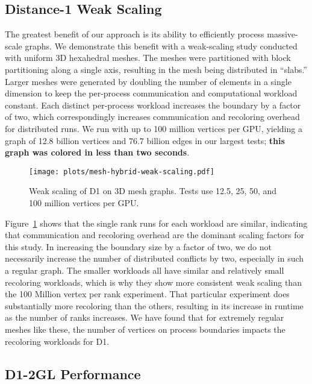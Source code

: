\subsection{Distance-1 Weak Scaling}

The greatest benefit of our approach is its ability to efficiently process massive-scale graphs. 
We demonstrate this benefit with a weak-scaling study conducted with uniform 3D hexahedral meshes.
The meshes were partitioned with block partitioning along a single axis, resulting in the mesh being distributed in ``slabs.''
Larger meshes were generated by doubling the number of elements in a single dimension to keep the per-process communication and computational workload constant.
Each distinct per-process workload increases the boundary by a factor of two, which correspondingly increases communication and recoloring overhead for distributed runs.
We run with up to 100 million vertices per GPU, yielding a graph of 12.8 billion vertices and 76.7 billion edges in our largest tests; \textbf{this graph was colored in less than two seconds}.

\begin{figure}[h]
  \centering
  \caption{Weak scaling of D1 on 3D mesh graphs. Tests use 12.5, 25, 50, and 100 million vertices per GPU.}
  \texttt{[image: plots/mesh-hybrid-weak-scaling.pdf]}
  \label{IAB:meshhybridweak}
\end{figure}

Figure~\ref{IAB:meshhybridweak} shows that the single rank runs for each workload are similar, 
indicating that communication and recoloring overhead are the dominant scaling factors for this study.
In increasing the boundary size by a factor of two, we do not necessarily increase the number of distributed conflicts by two,
especially in such a regular graph.
The smaller workloads all have similar and relatively small recoloring workloads, which is why they show more consistent weak scaling than 
the 100 Million vertex per rank experiment. 
That particular experiment does substantially more recoloring than the others, resulting in its increase in runtime as the number of ranks increases.
We have found that for extremely regular meshes like these, the number of vertices on process boundaries impacts the recoloring workloads for D1.

\subsection{D1-2GL Performance}

